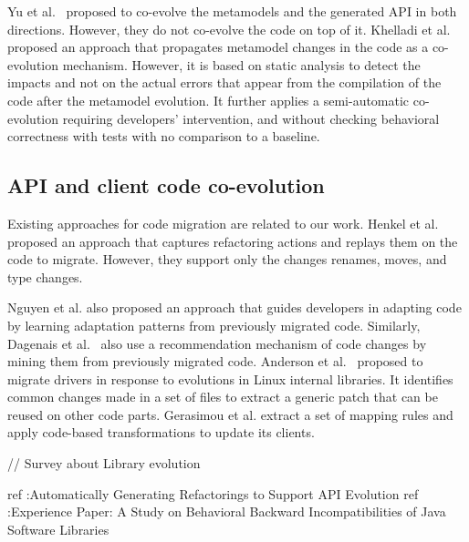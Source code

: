  Yu et al.~\cite{yu2012maintaining} proposed to co-evolve the metamodels and the generated API in both directions. However, they do not co-evolve the code on top of it.%
 Khelladi et al.~\cite{Khelladi2020} proposed an approach that propagates metamodel changes in the code as a co-evolution mechanism. However, it is based on static analysis to detect the impacts and not on the actual errors that appear from the compilation of the code after the metamodel evolution. It further applies a semi-automatic co-evolution requiring developers' intervention, and without checking behavioral correctness with tests with no comparison to a baseline. 
 
 
 \subsection{API and client code co-evolution}
 \label{API_evolution}
 
 
 Existing approaches for code migration are related to our work.%
  Henkel et al.~\cite{henkel2005catchup} proposed an approach that captures refactoring actions and replays them on the code to migrate. However, they support only the changes renames, moves, and type changes. 
 
 Nguyen et al. \cite{nguyen2010graph} also proposed an approach that guides developers in adapting code by learning adaptation patterns from previously migrated code. Similarly, Dagenais et al.~\cite{dagenais2011recommending,5070565,10.1145/1932682.1869486} also use a recommendation mechanism of code changes by mining them from previously migrated code. 
 Anderson et al.~\cite{andersen2010generic} proposed to migrate drivers in response to evolutions in Linux internal libraries. It identifies common changes made in a set of files to extract a generic patch that can be reused on other code parts. Gerasimou et al. \cite{10.1145/3194793.3194798} extract a set of mapping rules and apply code-based transformations to update its clients.
 
 // Survey about Library evolution \cite{10043250}
 
 ref :Automatically Generating Refactorings to Support API Evolution
 ref :Experience Paper: A Study on Behavioral Backward Incompatibilities of Java Software Libraries
 
